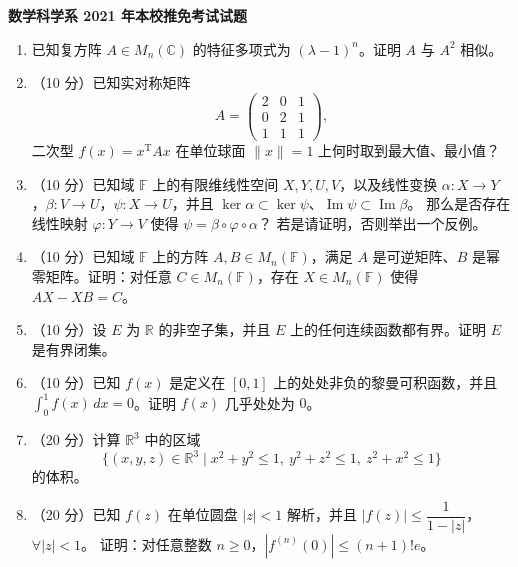 \documentclass[UTF8,11pt,fontset=none]{ctexart}
\newcommand{\paperheading}[1]{\begin{center}\Large\bfseries #1\end{center}\vspace{.45em}}
\newcommand{\newpaper}[1]{\clearpage\paperheading{#1}}
\begin{document}
\newpaper{数学科学系 2021 年本校推免考试试题}
\begin{enumerate}
\item 已知复方阵 $A\in M_n(\mathbb C)$ 的特征多项式为 $(\lambda-1)^n$。证明 $A$ 与 $A^2$ 相似。
\item （10 分）已知实对称矩阵
\[
A=\begin{pmatrix}2&0&1\\0&2&1\\1&1&1\end{pmatrix},
\]
二次型 $f(x)=x^{\mathrm T}Ax$ 在单位球面 $\|x\|=1$ 上何时取到最大值、最小值？
\item （10 分）已知域 $\mathbb F$ 上的有限维线性空间 $X,Y,U,V$，以及线性变换
$\alpha:X\to Y$，$\beta:V\to U$，$\psi:X\to U$，并且
$\ker\alpha\subset\ker\psi$、$\operatorname{Im}\psi\subset\operatorname{Im}\beta$。
那么是否存在线性映射 $\varphi:Y\to V$ 使得 $\psi=\beta\circ\varphi\circ\alpha$？
若是请证明，否则举出一个反例。
\item （10 分）已知域 $\mathbb F$ 上的方阵 $A,B\in M_n(\mathbb F)$，满足 $A$ 是可逆矩阵、$B$ 是幂零矩阵。证明：对任意 $C\in M_n(\mathbb F)$，存在 $X\in M_n(\mathbb F)$ 使得 $AX-XB=C$。
\item （10 分）设 $E$ 为 $\mathbb R$ 的非空子集，并且 $E$ 上的任何连续函数都有界。证明 $E$ 是有界闭集。
\item （10 分）已知 $f(x)$ 是定义在 $[0,1]$ 上的处处非负的黎曼可积函数，并且
$\displaystyle\int_0^1 f(x)\,dx=0$。证明 $f(x)$ 几乎处处为 $0$。
\item （20 分）计算 $\mathbb R^3$ 中的区域
\[
\{(x,y,z)\in\mathbb R^3\mid x^2+y^2\le1,\ y^2+z^2\le1,\ z^2+x^2\le1\}
\]
的体积。
\item （20 分）已知 $f(z)$ 在单位圆盘 $|z|<1$ 解析，并且
$|f(z)|\le \dfrac1{1-|z|}$，$\forall |z|<1$。
证明：对任意整数 $n\ge0$，$|f^{(n)}(0)|\le(n+1)!e$。
\end{enumerate}
\end{document}
